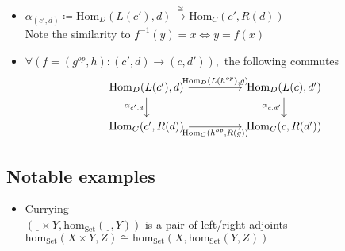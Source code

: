 \begin{itemize}
  \item $\alpha_{(c', d)} \coloneqq \mathrm{Hom}_D(L(c'), d)
    \overset{\cong}{\to} \mathrm{Hom}_C(c', R(d))$\\
    Note the similarity to $f^{-1}(y)=x \iff y=f(x)$
  \item $\forall (f = (g^{op}, h): (c', d) \to (c, d')),$
    the following commutes
    \[\begin{tikzcd}
      {\mathrm{Hom}_D(L(c'), d)} && {\mathrm{Hom}_D(L(c),d')} \\
      {\mathrm{Hom}_C(c', R(d))} && {\mathrm{Hom}_C(c,R(d'))}
      \arrow["{\alpha_{c',d}}"', from=1-1, to=2-1]
      \arrow["{\alpha_{c,d'}}"', from=1-3, to=2-3]
      \arrow["{\mathrm{Hom}_D(L(h^{op}), g)}", from=1-1, to=1-3]
      \arrow["{\mathrm{Hom}_C(h^{op}, R(g))}"', from=2-1, to=2-3]
    \end{tikzcd}\]
\end{itemize}

\subsection{Notable examples}
\begin{itemize}
  \item Currying\\
    $(\underline{\ \ } \times Y, \mathrm{hom}_{\mathrm{Set}}(\underline{\ \ }, Y))$
    is a pair of left/right adjoints\\
    $\mathrm{hom}_{\mathrm{Set}}(X\times Y, Z) \cong \mathrm{hom}_{\mathrm{Set}}
      (X, \mathrm{hom}_{\mathrm{Set}}(Y, Z))$
\end{itemize}